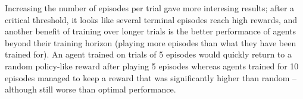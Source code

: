 Increasing the number of episodes per trial gave more interesing results;
after a critical threshold, it looks like several terminal episodes 
reach high rewards, and another benefit of training over longer trials is
the better performance of agents beyond their training horizon (playing
more episodes than what they have been trained for). An agent trained 
on trials of 5 episodes would quickly return to a random policy-like reward
after playing 5 episodes whereas agents trained for 10 episodes managed
to keep a reward that was significantly higher than random -- although still
worse than optimal performance.
